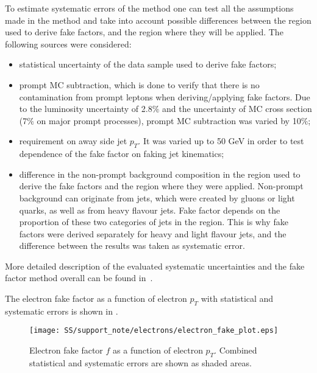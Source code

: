 To estimate systematic errors of the method one can test all the assumptions made in the method and take into account possible differences between 
the region used to derive fake factors, and the region where they will be applied. The following sources were considered:
\begin{itemize}
 \item statistical uncertainty of the data sample used to derive fake factors;
 \item prompt MC subtraction, which is done to verify that there is no contamination from prompt leptons when deriving/applying fake factors.
 Due to the luminosity uncertainty of 2.8$\%$ and the uncertainty of MC cross section (7$\%$ on major prompt processes), prompt MC subtraction
 was varied by 10$\%$;
 \item requirement on away side jet $p_T$. It was varied up to 50 GeV in order to test dependence of the fake factor on faking jet kinematics;
 \item difference in the non-prompt background composition in the region used to derive the fake factors and the region where they were applied.
 Non-prompt background can originate from jets, which were created by gluons or light quarks, as well as from heavy flavour jets.
 Fake factor depends on the proportion of these two categories of jets in the region. This is why fake factors were derived separately
 for heavy and light flavour jets, and the difference between the results was taken as systematic error.
\end{itemize}
More detailed description of the evaluated systematic uncertainties and the fake factor method overall can be found in~\cite{anthony_thesis}.

The electron fake factor as a function of electron $p_T$ with statistical and systematic errors is
shown in .
\begin{figure}[h]
\begin{center}
\texttt{[image: SS/support\_note/electrons/electron\_fake\_plot.eps]}
\caption{Electron fake factor $f$ as a function of electron $p_{T}$. Combined statistical and systematic errors are shown as shaded areas.}
\label{fig:ff_e_errs}
\end{center}
\end{figure} 


